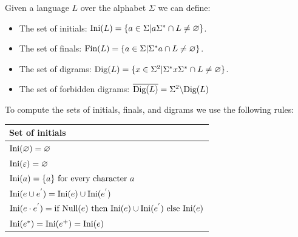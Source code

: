 Given a language $L$ over the alphabet $\Sigma$ we can define: 
\begin{itemize}
    \item The set of initials: $\textnormal{Ini}(L)=\{a \in \Sigma | a\Sigma^{*}\cap L \neq \varnothing\}$. 
    \item The set of finals: $\textnormal{Fin}(L)=\{a \in \Sigma | \Sigma^{*}a\cap L \neq \varnothing\}$.
    \item The set of digrams: $\textnormal{Dig}(L)=\{x \in \Sigma^{2} | \Sigma^{*}x\Sigma^{*} \cap L \neq \varnothing\}$.
    \item The set of forbidden digrams: $\overline{\textnormal{Dig}(L)}=\Sigma^{2} \backslash\textnormal{Dig}(L)$
\end{itemize}
To compute the sets of initials, finals, and digrams we use the following rules: 
\begin{table}[H]
    \centering
    \begin{tabular}{l}
    \hline
    \textbf{Set of initials}                                                                                                                 \\ \hline
    $\textnormal{Ini}(\varnothing)=\varnothing$                                                                                              \\
    $\textnormal{Ini}(\varepsilon)=\varnothing$                                                                                              \\
    $\textnormal{Ini}(a)=\{a\} \textnormal{ for every character }a$                                                                          \\
    $\textnormal{Ini}(e \cup e^{'})=\textnormal{Ini}(e) \cup \textnormal{Ini}(e^{'})$                                                        \\
    $\textnormal{Ini}(e \cdot e^{'})=\textnormal{if Null}(e) \textnormal{ then Ini}(e)\cup\textnormal{Ini}(e^{'}) \textnormal{ else Ini}(e)$ \\
    $\textnormal{Ini}(e^{*})=\textnormal{Ini}(e^{+})=\textnormal{Ini}(e)$                                                                    \\ \hline
    \end{tabular}
\end{table}
